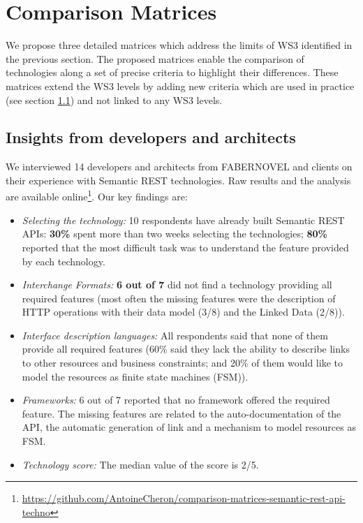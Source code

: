 \vspace*{-0.5cm}
\section{Comparison Matrices}\label{sec:matrix}

\vspace*{-0.3cm}
We propose three detailed matrices which address the limits of WS3 identified in the previous section. 
The proposed matrices enable the comparison of technologies along a set of precise criteria to highlight their differences. 
These matrices extend the WS3 levels by adding new criteria which are used in practice (see section \ref{sec:insight}) and not linked to any WS3 levels.

\vspace*{-0.2cm}
\subsection{Insights from developers and architects}\label{sec:insight}

We interviewed 14 developers and architects from FABERNOVEL and clients on their experience with Semantic REST technologies. Raw results and the analysis are available online\footnote{\url{https://github.com/AntoineCheron/comparison-matrices-semantic-rest-api-techno}}. Our key findings are:
\begin{itemize}
 \item \textit{Selecting the technology:} 10 respondents have already built Semantic REST APIs: \textbf{30\%} spent more than two weeks selecting the technologies; \textbf{80\%} reported that the most difficult task was to understand the feature provided by each technology.
 \item \textit{Interchange Formats:} \textbf{6 out of 7} did not find a technology providing all required features (most often the missing features were the description of HTTP operations with their data model (3/8) and the Linked Data (2/8)). 
 \item \textit{Interface description languages:} All respondents said that none of them provide all required features (60\% said they lack the ability to describe links to other resources and business constraints; and 20\% of them would like to model the resources as finite state machines (FSM)).
 \item \textit{Frameworks:} 6 out of 7 reported that no framework offered the required feature. The missing features are related to the auto-documentation of the API, the automatic generation of link and a mechanism to model resources as FSM.
 \item \textit{Technology score:} The median value of the score is 2/5.
\end{itemize}

